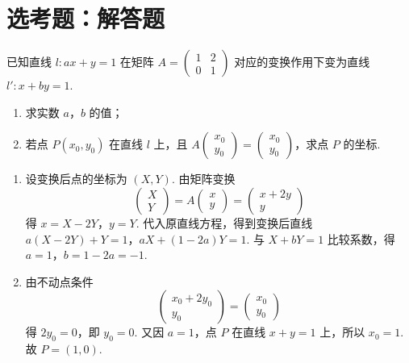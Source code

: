 \section{选考题：解答题}

\begin{problem}

已知直线 \(l: ax + y = 1\) 在矩阵 \(A = \begin{pmatrix}1 & 2 \\ 0 & 1\end{pmatrix}\) 对应的变换作用下变为直线 \(l': x + by = 1\).

\begin{enumerate}
\item 求实数 \(a\)，\(b\) 的值；
\item 若点 \(P(x_0, y_0)\) 在直线 \(l\) 上，且 \(A \begin{pmatrix}x_0 \\ y_0\end{pmatrix} = \begin{pmatrix}x_0 \\ y_0\end{pmatrix}\)，求点 \(P\) 的坐标.
\end{enumerate}
\end{problem}

\begin{solution}
\begin{enumerate}
\item 设变换后点的坐标为 \((X,Y)\). 由矩阵变换
\[
\begin{pmatrix}X\\Y\end{pmatrix}=A\begin{pmatrix}x\\y\end{pmatrix}
=\begin{pmatrix}x+2y\\y\end{pmatrix}
\]
得 \(x=X-2Y\)，\(y=Y\). 代入原直线方程，得到变换后直线
\(a(X-2Y)+Y=1\)，\(aX+(1-2a)Y=1\).
与 \(X+bY=1\) 比较系数，得 \(a=1\)，\(b=1-2a=-1\).
\item 由不动点条件
\[
\begin{pmatrix}x_0+2y_0\\y_0\end{pmatrix}=\begin{pmatrix}x_0\\y_0\end{pmatrix}
\]
得 \(2y_0=0\)，即 \(y_0=0\). 又因 \(a=1\)，点 \(P\) 在直线 \(x+y=1\) 上，所以 \(x_0=1\). 故 \(P=(1,0)\).
\end{enumerate}
\end{solution}

